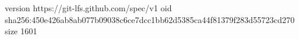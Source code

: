 version https://git-lfs.github.com/spec/v1
oid sha256:450e426ab8ab077b09038c6ce7dcc1bb62d5385ca44f81379f283d55723cd270
size 1601
